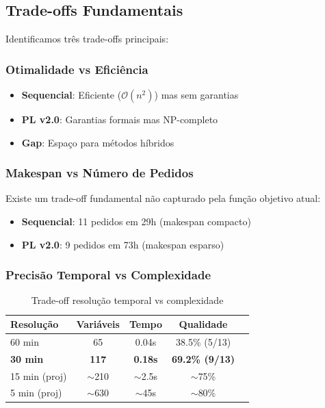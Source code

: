 \documentclass[12pt,a4paper]{article}
\theoremstyle{definition}
\newcommand{\BigO}{\mathcal{O}}
\begin{document}
\subsection{Trade-offs Fundamentais}

Identificamos três trade-offs principais:

\subsubsection{Otimalidade vs Eficiência}

\begin{itemize}
    \item \textbf{Sequencial}: Eficiente ($\BigO(n^2)$) mas sem garantias
    \item \textbf{PL v2.0}: Garantias formais mas NP-completo
    \item \textbf{Gap}: Espaço para métodos híbridos
\end{itemize}

\subsubsection{Makespan vs Número de Pedidos}

Existe um trade-off fundamental não capturado pela função objetivo atual:
\begin{itemize}
    \item \textbf{Sequencial}: 11 pedidos em 29h (makespan compacto)
    \item \textbf{PL v2.0}: 9 pedidos em 73h (makespan esparso)
\end{itemize}

\subsubsection{Precisão Temporal vs Complexidade}

\begin{table}[H]
\centering
\small
\begin{tabular}{@{}lcccc@{}}
\toprule
\textbf{Resolução} & \textbf{Variáveis} & \textbf{Tempo} & \textbf{Qualidade} \\
\midrule
60 min & 65 & 0.04s & 38.5\% (5/13) \\
\textbf{30 min} & \textbf{117} & \textbf{0.18s} & \textbf{69.2\% (9/13)} \\
15 min (proj) & $\sim$210 & $\sim$2.5s & $\sim$75\% \\
5 min (proj) & $\sim$630 & $\sim$45s & $\sim$80\% \\
\bottomrule
\end{tabular}
\caption{Trade-off resolução temporal vs complexidade}
\label{tab:tradeoff_resolucao}
\end{table}
\end{document}
